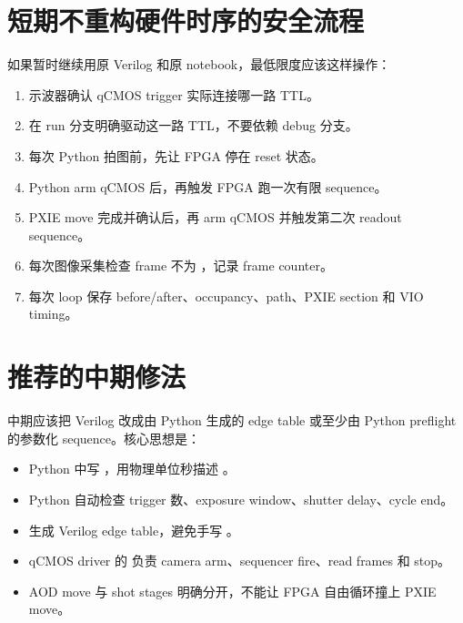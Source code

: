 \documentclass[11pt,oneside,openany]{book}
\begin{document}
\section{短期不重构硬件时序的安全流程}
如果暂时继续用原 Verilog 和原 notebook，最低限度应该这样操作：
\begin{enumerate}
  \item 示波器确认 qCMOS trigger 实际连接哪一路 TTL。
  \item 在 run 分支明确驱动这一路 TTL，不要依赖 debug 分支。
  \item 每次 Python 拍图前，先让 FPGA 停在 reset 状态。
  \item Python arm qCMOS 后，再触发 FPGA 跑一次有限 sequence。
  \item PXIE move 完成并确认后，再 arm qCMOS 并触发第二次 readout sequence。
  \item 每次图像采集检查 frame 不为 ，记录 frame counter。
  \item 每次 loop 保存 before/after、occupancy、path、PXIE section 和 VIO timing。
\end{enumerate}

\section{推荐的中期修法}
中期应该把 Verilog 改成由 Python 生成的 edge table 或至少由 Python preflight 的参数化 sequence。核心思想是：
\begin{itemize}
  \item Python 中写 ，用物理单位秒描述 。
  \item Python 自动检查 trigger 数、exposure window、shutter delay、cycle end。
  \item 生成 Verilog edge table，避免手写 。
  \item qCMOS driver 的  负责 camera arm、sequencer fire、read frames 和 stop。
  \item AOD move 与 shot stages 明确分开，不能让 FPGA 自由循环撞上 PXIE move。
\end{itemize}
\end{document}
